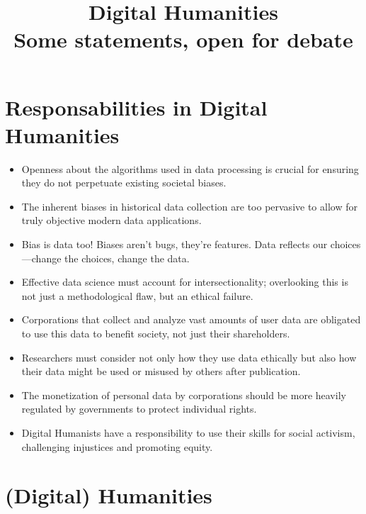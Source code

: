 \documentclass{article}
\title{Digital Humanities \\ \large Some statements, open for debate}
\author{} %
\date{} %
\begin{document}
\maketitle

\section*{Responsabilities in Digital Humanities}

\begin{itemize}

    \item Openness about the algorithms used in data processing is crucial for ensuring they do not perpetuate existing societal biases.
    
    \item The inherent biases in historical data collection are too pervasive to allow for truly objective modern data applications.

    \item Bias is data too! Biases aren't bugs, they're features. Data reflects our choices—change the choices, change the data.

    \item Effective data science must account for intersectionality; overlooking this is not just a methodological flaw, but an ethical failure.
        
    \item Corporations that collect and analyze vast amounts of user data are obligated to use this data to benefit society, not just their shareholders.
    
    \item Researchers must consider not only how they use data ethically but also how their data might be used or misused by others after publication.
    
    \item The monetization of personal data by corporations should be more heavily regulated by governments to protect individual rights.
    
    \item Digital Humanists have a responsibility to use their skills for social activism, challenging injustices and promoting equity.

\end{itemize}

\section*{(Digital) Humanities}
\end{document}
